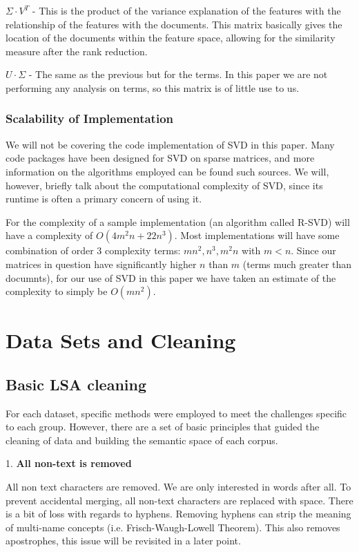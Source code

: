 \documentclass [12pt]{article}
\begin{document}
$\Sigma \cdot V^T$ - This is the product of the variance explanation of the features with the relationship of the features with the documents. This matrix basically gives the location of the documents within the feature space, allowing for the similarity measure after the rank reduction. 

$ U \cdot \Sigma$ - The same as the previous but for the terms. In this paper we are not performing any analysis on terms, so this matrix is of little use to us. 

\subsubsection{Scalability of Implementation} 

We will not be covering the code implementation of SVD in this paper. Many code packages have been designed for SVD on sparse matrices, and more information on the algorithms employed can be found such sources. We will, however, briefly talk about the computational complexity of SVD, since its runtime is often a primary concern of using it. 

For the complexity of a sample implementation (an algorithm called R-SVD) will have a complexity of $O(4m^2 n + 22 n^3)$. Most implementations will have some combination of order 3 complexity terms: $mn^2, n^3, m^2n$ with $m < n$. Since our matrices in question have significantly higher $n$ than $m$ (terms much greater than documnts), for our use of SVD in this paper we have taken an estimate of the complexity to simply be $O(mn^2)$. 


\section{Data Sets and Cleaning}


\subsection{Basic LSA cleaning} 

For each dataset, specific methods were employed to meet the challenges specific to each group. However, there are a set of basic principles that guided the cleaning of data and building the semantic space of each corpus. 

1. \textbf{All non-text is removed} 

All non text characters are removed. We are only interested in words after all. To prevent accidental merging, all non-text characters are replaced with space. There is a bit of loss with regards to hyphens. Removing hyphens can strip the meaning of multi-name concepts (i.e. Frisch-Waugh-Lowell Theorem). This also removes apostrophes, this issue will be revisited in a later point.
\end{document}
